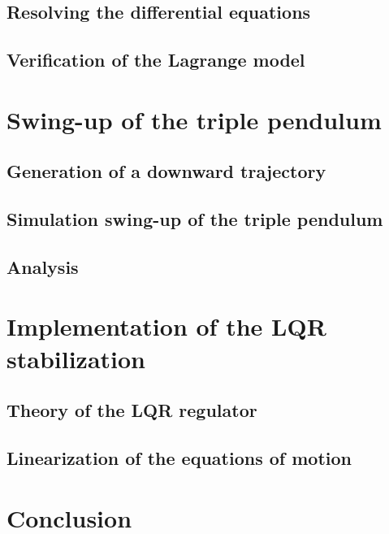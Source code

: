 \documentclass[a4paper,12pt,twoside]{article}
\begin{document}
\subsection{Resolving the differential equations}

\subsection{Verification of the Lagrange model}


\section{Swing-up of the triple pendulum}

\subsection{Generation of a downward trajectory}

\subsection{Simulation swing-up of the triple pendulum}

\subsection{Analysis}

\section{Implementation of the LQR stabilization}
\subsection{Theory of the LQR regulator}

\subsection{Linearization of the equations of motion}
\section{Conclusion}


\appendix
\nocite{*}


\end{document}
